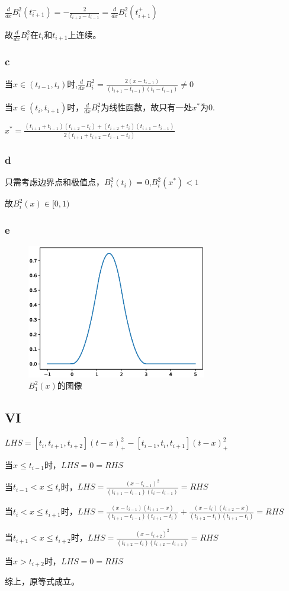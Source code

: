 \documentclass[12]{article}%
\begin{document}
            $\frac{d}{dx}B^2_i(t_{i+1}^-)=-\frac{2}{t_{i+2}-t_{i-1}}=\frac{d}{dx}B^2_i(t_{i+1}^+)$
            
            故$\frac{d}{dx}B^2_i$在$t_i$和$t_{i+1}$上连续。

            \subsubsection{c}
            当$x\in(t_{i-1},t_i)$时,$\frac{d}{dx}B^2_i=\frac{2(x-t_{i-1})}{(t_{i+1}-t_{i-1})(t_i-t_{i-1})}\neq 0$

            当$x\in(t_{i},t_{i+1})$时，$\frac{d}{dx}B^2_i$为线性函数，故只有一处$x^*$为0.

            $x^*=\frac{(t_{i+1}+t_{i-1})(t_{i+2}-t_{i})+(t_{i+2}+t_{i})(t_{i+1}-t_{i-1})}{2(t_{i+1}+t_{i+2}-t_{i-1}-t_{i})}$

            \subsubsection{d}
            只需考虑边界点和极值点，$B_i^2(t_i)=0$,$B_i^2(x^*)< 1$

            故$B^2_i(x)\in [0,1)$
            \subsubsection{e}
            \begin{figure}[H]
                \centering
                \includegraphics[width=0.7\textwidth]{./pic/e.eps}
                \caption{$B_1^2(x)$的图像}
            \end{figure}

        \subsection{VI}
        $LHS=[t_i,t_{i+1},t_{i+2}](t-x)^2_+-[t_{i-1},t_{i},t_{i+1}](t-x)^2_+$

        当$x\le t_{i-1}$时，$LHS=0=RHS$

        当$t_{i-1}<x\le t_{i}$时，$LHS=\frac{(x-t_{i-1})^2}{(t_{i+1}-t_{i-1})(t_{i}-t_{i-1})}=RHS$

        当$t_i<x\le t_{i+1}$时，$LHS=\frac{(x-t_{i-1})(t_{i+1}-x)}{(t_{i+1}-t_{i-1})(t_{i+1}-t_{i})}+\frac{(x-t_{i})(t_{i+2}-x)}{(t_{i+2}-t_{i})(t_{i+1}-t_{i})}=RHS$

        当$t_{i+1}<x\le t_{i+2}$时，$LHS=\frac{(x-t_{i+2})^2}{(t_{i+2}-t_{i})(t_{i+2}-t_{i+1})}=RHS$

        当$x> t_{i+2}$时，$LHS=0=RHS$

        综上，原等式成立。
            
\end{document}

